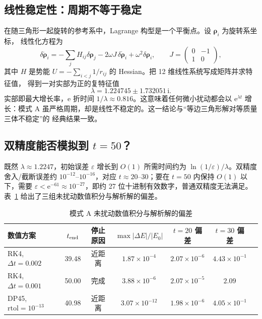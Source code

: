 \documentclass[UTF8,fontset=windows,11pt,a4paper]{ctexart}
\newcommand{\ee}{\mathrm{e}}
\begin{document}
\subsection{线性稳定性：周期不等于稳定}
在随三角形一起旋转的参考系中，Lagrange 构型是一个平衡点。设 $\boldsymbol\rho_i$ 为旋转系坐标，
线性化方程为
\begin{equation}\label{eq:lin}
\delta\ddot{\boldsymbol\rho}_i
=-\sum_j H_{ij}\delta\boldsymbol\rho_j
-2\omega J\,\delta\dot{\boldsymbol\rho}_i
+\omega^2\delta\boldsymbol\rho_i,
\qquad
J=\begin{pmatrix}0&-1\\1&0\end{pmatrix},
\end{equation}
其中 $H$ 是势能 $U=-\sum_{i<j}1/r_{ij}$ 的 Hessian。把 12 维线性系统写成矩阵并求特征值，
得到一对实部为正的复特征值
\begin{equation}\label{eq:eig}
\lambda=1.224745\pm1.732051\,\mathrm{i}.
\end{equation}
实部即最大增长率，e 折时间 $1/\lambda\approx0.816$。这意味着任何微小扰动都会以 $\ee^{\lambda t}$
增长：模式 A 虽严格周期，却是线性不稳定的。这一结论与“等边三角形解对等质量三体不稳定”的
经典结果一致。

\subsection{双精度能否模拟到 $t=50$？}
既然 $\lambda\approx1.2247$，初始误差 $\varepsilon$ 增长到 $O(1)$ 所需时间约为
$\ln(1/\varepsilon)/\lambda$。双精度舍入/截断误差约 $10^{-12}$--$10^{-16}$，对应
$t\approx20$--$30$；要在 $t=50$ 内保持 $O(1)$ 以下，需要
$\varepsilon<\ee^{-61}\approx10^{-27}$，即约 27 位十进制有效数字，普通双精度无法满足。
表~\ref{tab:precision} 给出了三组未扰动数值积分与解析解的偏差。

\begin{table}[H]
\centering\small
\caption{模式 A 未扰动数值积分与解析解的偏差}
\label{tab:precision}
\begin{tabular}{@{}lcccccc@{}}
\toprule
数值方案 & $t_{\rm end}$ & 停止原因 & $\max|\Delta E|/|E_0|$ & $t=20$ 偏差 & $t=30$ 偏差\\
\midrule
RK4, $\Delta t=0.002$ & 39.48 & 近距离 & $1.87\times10^{-4}$ & $2.07\times10^{-6}$ & $4.43\times10^{-1}$\\
RK4, $\Delta t=0.001$ & 50.00 & 完成 & $3.88\times10^{-6}$ & $2.07\times10^{-5}$ & $2.09$\\
DP45, $\mathrm{rtol}=10^{-13}$ & 40.98 & 近距离 & $3.07\times10^{-12}$ & $1.98\times10^{-6}$ & $4.05\times10^{-1}$\\
\bottomrule
\end{tabular}
\end{table}
\end{document}

